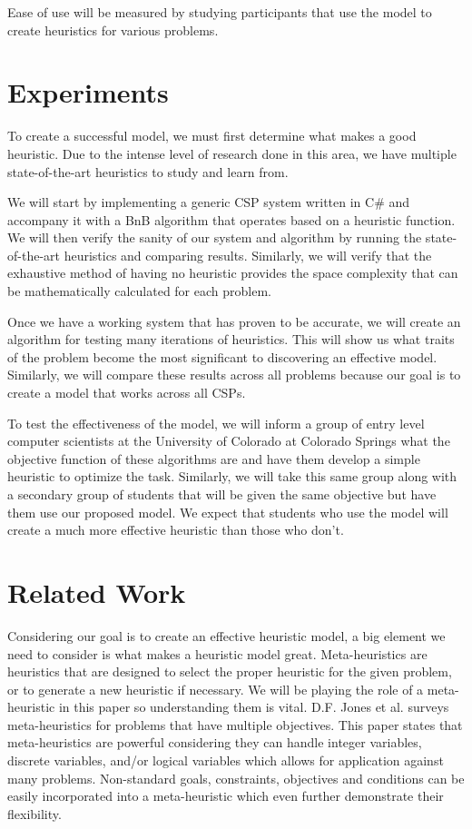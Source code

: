 \documentclass[10pt,twoside]{IEEEtran}
\begin{document}
Ease of use will be measured by studying participants that use the model to create heuristics for various problems.

\section{Experiments} \label{Experiments}
To create a successful model, we must first determine what makes a good heuristic. Due to the intense level of research done in this area, we have multiple state-of-the-art heuristics to study and learn from.

We will start by implementing a generic CSP system written in C\# and accompany it with a BnB algorithm that operates based on a heuristic function. We will then verify the sanity of our system and algorithm by running the state-of-the-art heuristics and comparing results. Similarly, we will verify that the exhaustive method of having no heuristic provides the space complexity that can be mathematically calculated for each problem.

Once we have a working system that has proven to be accurate, we will create an algorithm for testing many iterations of heuristics. This will show us what traits of the problem become the most significant to discovering an effective model. Similarly, we will compare these results across all problems because our goal is to create a model that works across all CSPs.

To test the effectiveness of the model, we will inform a group of entry level computer scientists at the University of Colorado at Colorado Springs what the objective function of these algorithms are and have them develop a simple heuristic to optimize the task. Similarly, we will take this same group along with a secondary group of students that will be given the same objective but have them use our proposed model. We expect that students who use the model will create a much more effective heuristic than those who don't.

\section{Related Work}
Considering our goal is to create an effective heuristic model, a big element we need to consider is what makes a heuristic model great. Meta-heuristics are heuristics that are designed to select the proper heuristic for the given problem, or to generate a new heuristic if necessary. We will be playing the role of a meta-heuristic in this paper so understanding them is vital. D.F. Jones et al. \cite{JONES20021} surveys meta-heuristics for problems that have multiple objectives. This paper states that meta-heuristics are powerful considering they can handle integer variables, discrete variables, and/or logical variables which allows for application against many problems. Non-standard goals, constraints, objectives and conditions can be easily incorporated into a meta-heuristic which even further demonstrate their flexibility.
\end{document}
